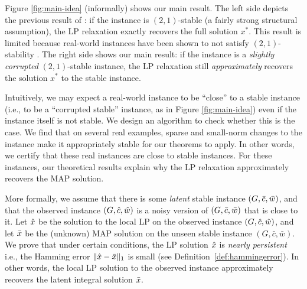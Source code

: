 
Figure \ref{fig:main-idea} (informally) shows our main result. The left side depicts the previous result of \citet{LanSonVij18}: if the instance is $(2,1)$-stable (a fairly strong structural assumption), the LP relaxation exactly recovers the full solution $x^*$. This result is limited because real-world instances have been shown to not satisfy $(2,1)$-stability \citep{LanSonVij19}. The right side shows our main result: if the instance is a \emph{slightly corrupted} $(2,1)$-stable instance, the LP relaxation still \emph{approximately} recovers the solution $x^*$ to the stable instance.

Intuitively, we may expect a real-world instance to be ``close'' to a stable instance (i.e., to be a ``corrupted stable'' instance, as in Figure \ref{fig:main-idea}) even if the instance itself is not stable. We design an algorithm to check whether this is the case. We find that on several real examples, sparse and small-norm changes to the instance make it appropriately stable for our theorems to apply. In other words, we certify that these real instances are close to stable instances. For these instances, our theoretical results explain why the LP relaxation approximately recovers the MAP solution.

More formally, we assume that there is some \emph{latent} stable instance $(G,\bar{c},\bar{w})$, and that the observed instance $(G,\hat{c},\hat{w})$ is a noisy version of $(G,\bar{c},\bar{w})$ that is close to it.
Let $\hat{x}$ be the solution to the local LP on the observed instance $(G,\hat{c},\hat{w})$, and let $\bar{x}$ be the (unknown) MAP solution on the unseen stable instance $(G,\bar{c},\bar{w})$. We prove that under certain conditions, the LP solution $\hat{x}$ is {\em nearly persistent} i.e., the Hamming error $\lVert \hat{x} - \bar{x} \rVert_1$ is small (see Definition~\ref{def:hammingerror}). In other words, the local LP solution to the observed instance approximately recovers the latent integral solution $\bar{x}$.


